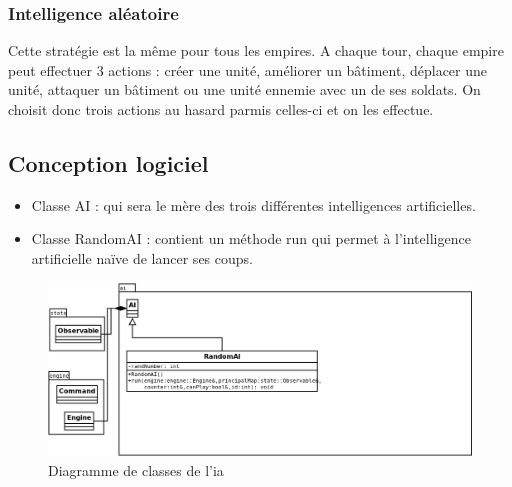 \documentclass[12pt,a4paper]{article}
\begin{document}
\subsubsection{Intelligence aléatoire}
Cette stratégie est la même pour tous les empires. A chaque tour, chaque empire peut effectuer 3 actions : créer une unité, améliorer un bâtiment, déplacer une unité, attaquer un bâtiment ou une unité ennemie avec un de ses soldats. On choisit donc trois actions au hasard parmis celles-ci et on les effectue. 

\subsection{Conception logiciel}
\begin{itemize}
    \item Classe AI : qui sera le mère des trois différentes intelligences artificielles.
    \item Classe RandomAI : contient un méthode run qui permet à l'intelligence artificielle naïve de lancer ses coups. 
\end{itemize}

\begin{figure}[!ht]
\centering
    \includegraphics[width=1\textwidth]{ressources/ai.png}
     \caption{Diagramme de classes de l'ia}
\end{figure}
\end{document}
